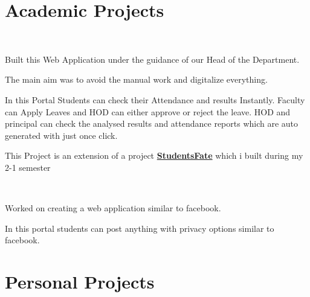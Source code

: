 \documentclass[]{deedy-resume-openfont}
\begin{document}
\begin{minipage}[t]{0.66\textwidth}
\section{Academic Projects}
\\
\begin{tightemize}
\item Built this Web Application under the guidance of our Head of the Department. 
\item The main aim was to avoid the manual work and digitalize everything. \item In this Portal Students can check their Attendance and results Instantly. Faculty can Apply Leaves and HOD can either approve or reject the leave. HOD and principal can check the analysed results and attendance reports which are auto generated with just once click.
\item This Project is an extension of a project \textbf{\href{http://studentsfate.phpnet.us/}{StudentsFate}} which i built during my 2-1 semester
\end{tightemize}
\sectionsep

\\
\begin{tightemize}
\item Worked on creating a web application similar to facebook.
\item In this portal students can post anything with privacy options similar to facebook.
\end{tightemize}
\sectionsep


\section{Personal Projects}

\\
\vspace{\topsep}
\\
\sectionsep

\nocite{*}

\end{minipage} 
\end{document}
